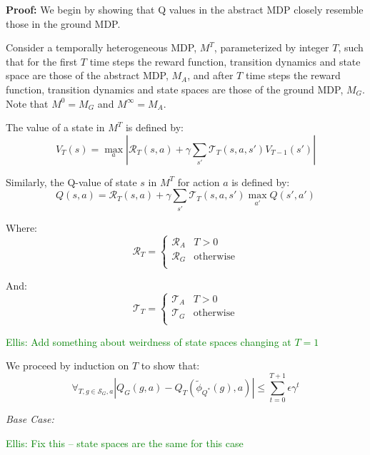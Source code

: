 \documentclass{article}
\newcommand{\ep}{\widetilde \phi}
\newcommand{\epQ}{\ep_{Q^*}}
\newcommand\enote[1]{\textcolor{green}{Ellis: #1}}
\begin{document}
\textbf{Proof:}
We begin by showing that Q values in the abstract \ac{MDP} closely resemble those in the ground \ac{MDP}.

Consider a temporally heterogeneous \ac{MDP}, $M^T$, parameterized by integer $T$, such that for the first $T$ time steps the reward function, transition dynamics and state space are those of the abstract MDP, $M_A$, and after $T$ time steps the reward function, transition dynamics and state spaces are those of the ground MDP, $M_G$. Note that $M^0 = M_G$ and $M^\infty = M_A$.

The value of a state in $M^T$ is defined by:
\begin{equation}
V_T(s) = \max_a \left| \mathcal{R}_T(s,a) + \gamma \sum_{s'} \mathcal{T}_T(s,a,s') V_{T-1}(s') \right|
\end{equation}

Similarly, the Q-value of state $s$ in $M^T$ for action $a$ is defined by:
\begin{equation}
Q(s, a) = \mathcal{R}_T(s,a) + \gamma \sum_{s'} \mathcal{T}_T(s,a,s') \max_{a'} Q(s',a')
\end{equation}

Where:
\begin{equation}
\mathcal{R}_T = \begin{cases}
\mathcal{R}_A& T > 0 \\
\mathcal{R}_G& \text{otherwise} \\
\end{cases}
\end{equation}

And:
\begin{equation}
\mathcal{T}_T = \begin{cases}
\mathcal{T}_A& T > 0 \\
\mathcal{T}_G& \text{otherwise} \\
\end{cases}
\end{equation}

\enote{Add something about weirdness of state spaces changing at $T=1$}

We proceed by induction on $T$ to show that:
\begin{equation}
\forall_{T, g \in \mathcal{S}_G, a} |Q_G(g, a) - Q_T(\epQ(g), a)| \leq \sum_{t=0}^{T+1} \epsilon \gamma^t
\end{equation}

\textit{Base Case:}

\enote{Fix this -- state spaces are the same for this case}
\end{document}
